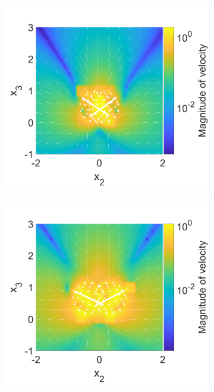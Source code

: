 \begin{figure}
\begin{subfigure}[b]{0.328\textwidth}
    \caption[]{\label{fig:PairD}}
\end{subfigure}
\begin{subfigure}[b]{0.328\textwidth}
    \centering
    \includegraphics[width=\textwidth]{Images/squirmers/Pair-5.pdf}
    \caption[]{\label{fig:PairE}}
\end{subfigure}
\begin{subfigure}[b]{0.328\textwidth}
    \centering
    \includegraphics[width=\textwidth]{Images/squirmers/Pair-6.pdf}

\end{subfigure}
\end{figure}
